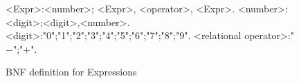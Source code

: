 \begin{figure}[H]
\begin{grammar}
<Expr>:<number>; <Expr>, <operator>, <Expr>.
<number>:<digit>;<digit>,<number>.
<digit>:"0";"1";"2";"3";"4";"5";"6";"7";"8";"9".
<relational operator>:"$-$";"$+$".
\end{grammar}
\caption{BNF definition for Expressions}
\label{grammar:bnf:expr}
\end{figure}